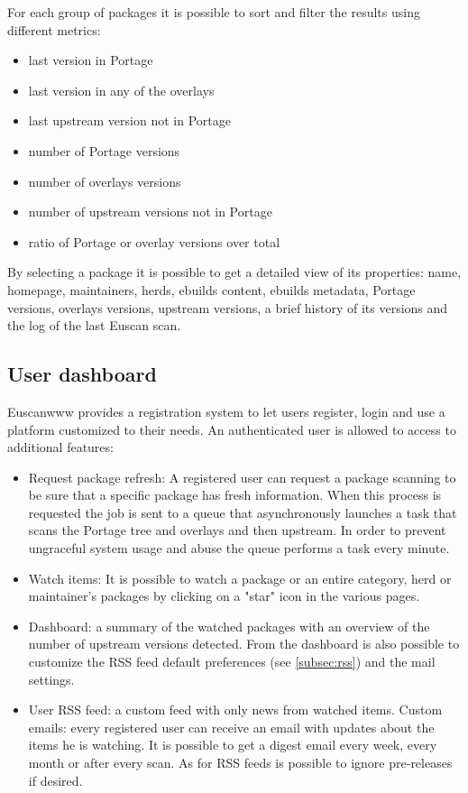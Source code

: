 For each group of packages it is possible to sort and filter the results using different metrics:

\begin{itemize}
\item last version in Portage
\item last version in any of the overlays
\item last upstream version not in Portage
\item number of Portage versions
\item number of overlays versions
\item number of upstream versions not in Portage
\item ratio of Portage or overlay versions over total
\end{itemize}

By selecting a package it is possible to get a detailed view of its properties: name, homepage, maintainers, herds, ebuilds content, ebuilds metadata, Portage versions, overlays versions, upstream versions, a brief history of its versions and the log of the last Euscan scan.


\subsection{User dashboard}
Euscanwww provides a registration system to let users register, login and use a platform customized to their needs. An authenticated user is allowed to access to additional features:

\begin{itemize}
\item Request package refresh: A registered user can request a package scanning to be sure that a specific package has fresh information. When this process is requested the job is sent to a queue that asynchronously launches a task that scans the Portage tree and overlays and then upstream. In order to prevent ungraceful system usage and abuse the queue performs a task every minute.

\item Watch items: It is possible to watch a package or an entire category, herd or maintainer's packages by clicking on a "star" icon in the various pages.

\item Dashboard: a summary of the watched packages with an overview of the number of upstream versions detected. From the dashboard is also possible to customize the RSS feed default preferences (see \ref{subsec:rss}) and the mail settings.

\item User RSS feed: a custom feed with only news from watched items.
Custom emails: every registered user can receive an email with updates about the items he is watching. It is possible to get a digest email every week, every month or after every scan. As for RSS feeds is possible to ignore pre-releases if desired.
\end{itemize}

